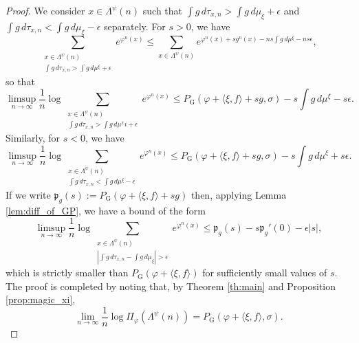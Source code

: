 \documentclass[11pt,letterpaper]{amsart}
\theoremstyle{definition}
\numberwithin{equation}{section}
\numberwithin{theorem}{section}
\def\vp{\varphi}
\def\PG{P_{\mathrm{G}}}
\begin{document}
\begin{proof}
We consider $x \in \Lambda^\psi(n)$ such that 
$\int g \, d\tau_{x,n} > \int g \, d\mu_\xi +\epsilon$ and
$\int g \, d\tau_{x,n} < \int g \, d\mu_\xi -\epsilon$ separately.
For $s>0$, we have
\[
\sum_{\substack{x \in \Lambda^\psi(n) \\ \int g \, d\tau_{x,n} >\int g \, d\mu^\xi +\epsilon}}
e^{\vp^n(x)}
\le 
\sum_{x \in \Lambda^\psi(n)} e^{\vp^n(x) + sg^n(x) - ns\int g \, d\mu^\xi -ns\epsilon},
\]
so that
\[
\limsup_{n \to \infty} \frac{1}{n} \log 
\sum_{\substack{x \in \Lambda^\psi(n) \\ \int g \, d\tau_{x,n} >\int g \, d\mu^xi +\epsilon}}
e^{\vp^n(x)}
\le \PG(\vp+\langle \xi,f\rangle +sg,\sigma) -s\int g \, d\mu^\xi -s\epsilon.
\]
Similarly, for $s<0$, we have
\[
\limsup_{n \to \infty} \frac{1}{n} \log 
\sum_{\substack{x \in \Lambda^\psi(n) \\ \int g \, d\tau_{x,n} <\int g \, d\mu^\xi -\epsilon}}
e^{\vp^n(x)}
\le \PG(\vp+\langle \xi,f\rangle +sg,\sigma) -s\int g \, d\mu^\xi +s\epsilon.
\]
If we write $\mathfrak p_g(s) := \PG(\vp+\langle \xi,f\rangle +sg)$ then,
applying Lemma \ref{lem:diff_of_GP}, we have a bound of the form
\[
\limsup_{n \to \infty} \frac{1}{n} \log
\sum_{\substack{x \in \Lambda^\psi(n) \\
|\int g \, d\tau_{x,n} -\int g \, d\mu_\xi|>\epsilon}}
e^{\vp^n(x)} 
\le
\mathfrak p_g(s) - s\mathfrak p_g'(0) -\epsilon |s|,
\]
which is strictly smaller than $\PG(\vp+\langle \xi,f \rangle)$ for sufficiently small values of $s$. 
The proof is completed by noting that, by
Theorem \ref{th:main} and
Proposition \ref{prop:magic_xi},
\[
\lim_{n \to \infty} \frac{1}{n} \log \Pi_\vp(\Lambda^\psi(n)) = \PG(\vp+\langle \xi,f \rangle,\sigma).
\]
\end{proof}
\end{document}
